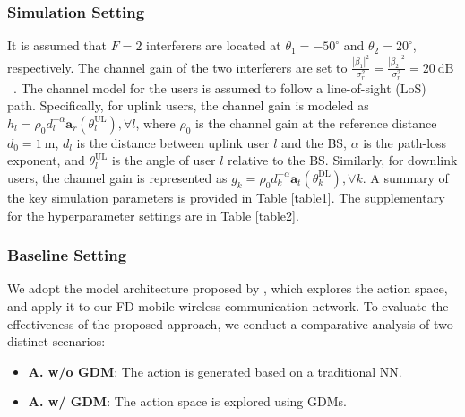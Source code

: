 \documentclass[comsoc,journal]{IEEEtran}
\begin{document}
\subsubsection{Simulation Setting}
It is assumed that
$F=2$ interferers are located at $\theta_1=-50^{\circ}$ and $\theta_2=20^{\circ}$,
respectively. The channel gain of the two interferers are set to $\frac{|\beta_1|^2}{\sigma_r^2} = \frac{|\beta_2|^2}{\sigma_r^2} = 20 \ \text{dB}$~\cite{he2023full}. The channel model for the users is assumed to follow a line-of-sight (LoS) path. Specifically, for uplink users, the channel gain is modeled as $h_l=\rho_0d_l^{-\alpha}\mathbf{a}_r(\theta_l^{\text{UL}}), \forall l$, where $\rho_0$ is the channel gain at the reference distance $d_0=1~\text{m}$, $d_l$ is the distance between uplink user $l$ and the BS, $\alpha$ is the path-loss exponent, and $\theta_l^{\text{UL}}$ is the angle of user $l$ relative to the BS\cite{miao2024utility}. Similarly, for downlink users, the channel gain is represented as $g_k=\rho_0d_k^{-\alpha}\mathbf{a}_t(\theta_k^{\text{DL}}), \forall k$. A summary of the key simulation parameters is provided in Table \ref{table1}. The supplementary for the hyperparameter settings are in Table \ref{table2}. 

\subsubsection{Baseline Setting}
We adopt the model architecture proposed by \cite{du2024enhancing}, which explores the action space, and apply it to our FD mobile wireless communication network. To evaluate the effectiveness of the proposed approach, we conduct a comparative analysis of two distinct scenarios:
\begin{itemize}
    \item \textbf{A. w/o GDM}: The action is generated based on a traditional NN.
    \item \textbf{A. w/ GDM}: The action space is explored using GDMs.
\end{itemize}
\end{document}
